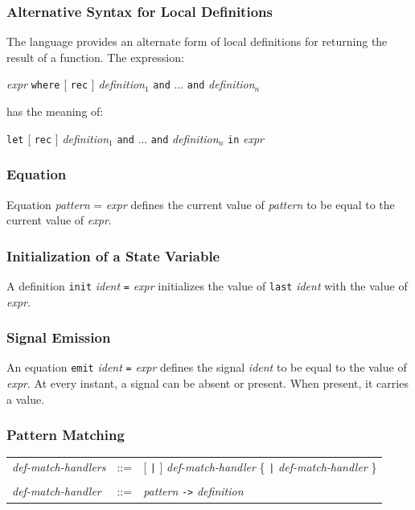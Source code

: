 \documentclass[11pt,titlepage,twoside]{report}
\newcommand{\Let}{\mbox{{\tt let}}}
\newcommand{\Rec}{\mbox{{\tt rec}}}
\newcommand{\In}{\mbox{{\tt in}}}
\newcommand{\And}{\mbox{{\tt and}}}
\newcommand{\Emit}{\mbox{{\tt emit}}}
\newcommand{\Last}{\mbox{{\tt last}}}
\newcommand{\Minusgreater}{\mbox{{\tt ->}}}
\newcommand{\Where}{\mbox{{\tt where}}}
\newcommand{\term}[1]{{\tt #1}}
\newcommand{\nterm}[1]{{\em #1}}
\begin{document}
\subsubsection{Alternative Syntax for Local Definitions}

The language provides an alternate form of local definitions for returning
the result of a function. The expression:
\begin{center}
\nterm{expr} \term{\Where} [ \term{\Rec} ]
  \nterm{definition}$_1$ \term{\And} ... \term{\And} \nterm{definition}$_n$ 
\end{center}
has the meaning of:
\begin{center}
  \term{\Let} [ \term{\Rec} ] 
  \nterm{definition}$_1$ \term{\And} ... \term{\And} \nterm{definition}$_n$
  \term{\In} \nterm{expr}
\end{center}

\subsubsection{Equation}

Equation \nterm{pattern} = \nterm{expr} defines the current
value of \nterm{pattern} to be equal to the current value of \nterm{expr}.

\subsubsection{Initialization of a State Variable}

A definition \term{init} \nterm{ident} \term{=} \nterm{expr} initializes
the value of \term{\Last} \nterm{ident} with the
value of \nterm{expr}.

\subsubsection{Signal Emission}

An equation \term{\Emit} \nterm{ident} \term{=} \nterm{expr} defines
the signal \nterm{ident} to be equal to the value of \nterm{expr}. At
every instant, a signal can be absent or present. When present, it carries
a value.

\subsubsection{Pattern Matching}

\begin{center}
\begin{tabular}{lcl}
\nterm{def-match-handlers}
   & ::=        & [ \term{|} ] \nterm{def-match-handler}
                  \{ \term{|} \nterm{def-match-handler} \} 
\\ \\
\nterm{def-match-handler}
   & ::=        & \nterm{pattern} \term{\Minusgreater} \nterm{definition}
\end{tabular}
\end{center}
\end{document}
